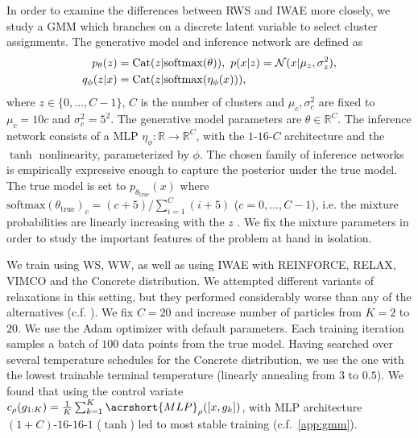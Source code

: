 %
In order to examine the differences between \gls{RWS} and \gls{IWAE} more closely, we study  a \gls{GMM} which branches on a discrete latent variable to select cluster assignments.
The generative model and inference network are defined as
%
\begin{align*}
  p_\theta(z) &= \mathrm{Cat}(z \lvert \mathrm{softmax}(\theta)),\,\,
  p(x \lvert z) = \mathcal{N}(x \lvert \mu_z, \sigma_z^2), \\
  q_\phi(z \lvert x) &= \mathrm{Cat}(z \lvert \mathrm{softmax}(\eta_\phi(x))),
\end{align*}
%
where $z \in \{0, \dotsc, C - 1\}$,  $C$ is the number of clusters and $\mu_c, \sigma_c^2$ are fixed to $\mu_c = 10c$ and $\sigma_c^2 = 5^2$.
The generative model parameters are $\theta \in \mathbb R^C$.
The inference network consists of a \acrlong{MLP} $\eta_\phi: \mathbb R \to \mathbb R^C$, with the $1$-$16$-$C$ architecture and the $\tanh$ nonlinearity, parameterized by $\phi$.
The chosen family of inference networks is empirically expressive enough to capture the posterior under the true model.
The true model is set to $p_{\theta_\text{true}}(x)$ where $\mathrm{softmax}(\theta_\text{true})_c = (c + 5) / \sum_{i = 1}^C (i + 5)$ ($c = 0, \dotsc, C - 1$), i.e. the mixture probabilities are linearly increasing with the $z$
.
We fix the mixture parameters in order to study the important features of the problem at hand in isolation.

We train using \gls{WS}, \gls{WW}, as well as using \gls{IWAE} with \acrshort{REINFORCE}, \acrshort{RELAX}, \gls{VIMCO} and the Concrete distribution.
%
We attempted different variants of relaxations \citep{rolfe2016dvae,vahdat2018dvaepp} in this setting, but they performed considerably worse than any of the alternatives (c.f. ).
%
We fix $C = 20$ and increase number of particles from $K = 2$ to $20$.
%
We use the Adam optimizer with default parameters.
%
Each training iteration samples a batch of $100$ data points from the true model.
%
Having searched over several temperature schedules for the Concrete distribution, we use the one with the lowest trainable terminal temperature (linearly annealing from $3$ to $0.5$).
%
We found that using the control variate $c_\rho(g_{1:K}) = \frac{1}{K} \sum_{k = 1}^K \acrshort{MLP}_\rho([x, g_k])$, with \gls{MLP} architecture $(1 + C)$-$16$-$16$-$1$ ($\tanh$) led to most stable training (c.f.\ \cref{app:gmm}).

